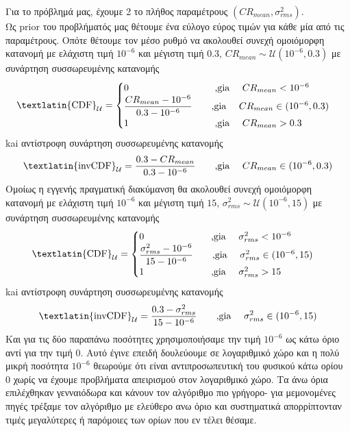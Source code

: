 Για το πρόβλημά μας, έχουμε 2 το πλήθος παραμέτρους $(CR_{mean}, \sigma_{rms}^2)$.\\
Ως \textlatin{prior} του προβλήματός μας θέτουμε ένα εύλογο εύρος τιμών για κάθε μία από τις παραμέτρους. Οπότε θέτουμε τον μέσο ρυθμό να ακολουθεί συνεχή ομοιόμορφη κατανομή με ελάχιστη τιμή $10^{-6}$ και μέγιστη τιμή $0.3$, $CR_{mean} \sim \mathcal{U}(10^{-6} , 0.3)$ με συνάρτηση συσσωρευμένης κατανομής 
$$ \mbox{\textlatin{CDF}}_{\mathcal{U}} = \begin{cases} 0   \mbox{\quad \quad \quad \quad \quad \quad \quad \quad \quad ,gia \quad } CR_{mean}<10^{-6}   \\ \dfrac{CR_{mean} - 10^{-6}}{0.3-10^{-6}}  \mbox{\quad \quad  ,gia \quad } CR_{mean} \in (10^{-6}, 0.3) \\ 1  \mbox{\quad \quad \quad \quad \quad \quad \quad \quad \quad ,gia \quad} CR_{mean}>0.3  \end{cases}$$ 
kai αντίστροφη συνάρτηση συσσωρευμένης κατανομής
$$  \mbox{\textlatin{invCDF}}_{\mathcal{U}} = \dfrac{0.3 - CR_{mean}}{0.3-10^{-6}} \mbox{\quad \quad  ,gia \quad } CR_{mean} \in (10^{-6}, 0.3)$$
Ομοίως η εγγενής πραγματική διακύμανση θα ακολουθεί συνεχή ομοιόμορφη κατανομή με ελάχιστη τιμή $10^{-6}$ και μέγιστη τιμή $15$, $\sigma_{rms}^2  \sim \mathcal{U}(10^{-6} , 15)$ με συνάρτηση συσσωρευμένης κατανομής 
$$ \mbox{\textlatin{CDF}}_{\mathcal{U}} = \begin{cases} 0   \mbox{\quad \quad \quad \quad \quad \quad \quad ,gia \quad } \sigma_{rms}^2<10^{-6}   \\ \dfrac{\sigma_{rms}^2 - 10^{-6}}{15-10^{-6}}  \mbox{\quad \quad  ,gia \quad } \sigma_{rms}^2 \in (10^{-6}, 15) \\ 1  \mbox{\quad \quad \quad \quad \quad \quad \quad  ,gia \quad} \sigma_{rms}^2>15  \end{cases}$$ 
kai αντίστροφη συνάρτηση συσσωρευμένης κατανομής
$$  \mbox{\textlatin{invCDF}}_{\mathcal{U}} = \dfrac{0.3 -\sigma_{rms}^2}{15-10^{-6}} \mbox{\quad \quad  ,gia \quad } \sigma_{rms}^2 \in (10^{-6}, 15)$$
Και για τις δύο παραπάνω ποσότητες χρησιμοποιήσαμε την τιμή $10^{-6}$ ως κάτω όριο αντί για την τιμή $0$. Αυτό έγινε επειδή δουλεύουμε σε λογαριθμικό χώρο και η πολύ μικρή ποσότητα $10^{-6}$ θεωρούμε ότι είναι αντιπροσωπευτική του φυσικού κάτω ορίου $0$ χωρίς να έχουμε προβλήματα απειρισμού στον λογαριθμικό χώρο. Τα άνω όρια επιλέχθηκαν γενναιόδωρα και κάνουν τον αλγόριθμο πιο γρήγορο- για μεμονομένες πηγές τρέξαμε τον αλγόριθμο με ελεύθερο ανω όριο και συστηματικά απορρίπτονταν τιμές μεγαλύτερες ή παρόμοιες των ορίων που εν τέλει θέσαμε.

